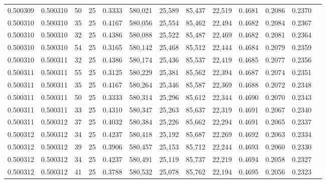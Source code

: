 \begin{tabular}{rrrrrrrrrrrrr}
0.500309 & 0.500310 &    50 &  25 &                                     0.3333 & 580,021 &  25,589 &  85,437 &  22,519 & 0.4681 & 0.2086 & 0.2370 \\
0.500310 & 0.500310 &    35 &  25 &                                     0.4167 & 580,056 &  25,554 &  85,462 &  22,494 & 0.4682 & 0.2084 & 0.2367 \\
0.500310 & 0.500310 &    32 &  25 &                                     0.4386 & 580,088 &  25,522 &  85,487 &  22,469 & 0.4682 & 0.2081 & 0.2364 \\
0.500310 & 0.500310 &    54 &  25 &                                     0.3165 & 580,142 &  25,468 &  85,512 &  22,444 & 0.4684 & 0.2079 & 0.2359 \\
0.500310 & 0.500311 &    32 &  25 &                                     0.4386 & 580,174 &  25,436 &  85,537 &  22,419 & 0.4685 & 0.2077 & 0.2356 \\
0.500311 & 0.500311 &    55 &  25 &                                     0.3125 & 580,229 &  25,381 &  85,562 &  22,394 & 0.4687 & 0.2074 & 0.2351 \\
0.500311 & 0.500311 &    35 &  25 &                                     0.4167 & 580,264 &  25,346 &  85,587 &  22,369 & 0.4688 & 0.2072 & 0.2348 \\
0.500311 & 0.500311 &    50 &  25 &                                     0.3333 & 580,314 &  25,296 &  85,612 &  22,344 & 0.4690 & 0.2070 & 0.2343 \\
0.500311 & 0.500311 &    33 &  25 &                                     0.4310 & 580,347 &  25,263 &  85,637 &  22,319 & 0.4691 & 0.2067 & 0.2340 \\
0.500311 & 0.500312 &    37 &  25 &                                     0.4032 & 580,384 &  25,226 &  85,662 &  22,294 & 0.4691 & 0.2065 & 0.2337 \\
0.500312 & 0.500312 &    34 &  25 &                                     0.4237 & 580,418 &  25,192 &  85,687 &  22,269 & 0.4692 & 0.2063 & 0.2334 \\
0.500312 & 0.500312 &    39 &  25 &                                     0.3906 & 580,457 &  25,153 &  85,712 &  22,244 & 0.4693 & 0.2060 & 0.2330 \\
0.500312 & 0.500312 &    34 &  25 &                                     0.4237 & 580,491 &  25,119 &  85,737 &  22,219 & 0.4694 & 0.2058 & 0.2327 \\
0.500312 & 0.500312 &    41 &  25 &                                     0.3788 & 580,532 &  25,078 &  85,762 &  22,194 & 0.4695 & 0.2056 & 0.2323 \\

\end{tabular}
